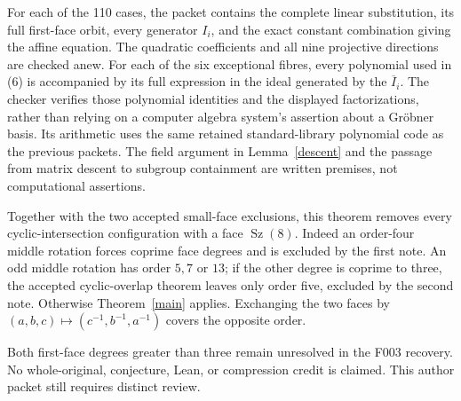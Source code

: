 \documentclass[11pt,a4paper]{article}
\newcommand{\Sz}{\operatorname{Sz}}
\begin{document}
For each of the 110 cases, the packet contains the complete linear
substitution, its full first-face orbit, every generator $I_i$, and
the exact constant combination giving the affine equation. The
quadratic coefficients and all nine projective directions are checked
anew. For each of the six exceptional fibres, every polynomial used
in (6) is accompanied by its full expression in the ideal generated
by the $\overline I_i$. The checker verifies those polynomial
identities and the displayed factorizations, rather than relying on
a computer algebra system's assertion about a Gr\"obner basis.
Its arithmetic uses the same retained standard-library polynomial
code as the previous packets. The field argument in
Lemma~\ref{descent} and the passage from matrix descent to subgroup
containment are written premises, not computational assertions.

Together with the two accepted small-face exclusions, this theorem
removes every cyclic-intersection configuration with a face $\Sz(8)$.
Indeed an order-four middle rotation forces coprime face degrees and
is excluded by the first note. An odd middle rotation has order
$5,7$ or $13$; if the other degree is coprime to three, the accepted
cyclic-overlap theorem leaves only order five, excluded by the second
note. Otherwise Theorem~\ref{main} applies. Exchanging the two faces
by $(a,b,c)\mapsto(c^{-1},b^{-1},a^{-1})$ covers the opposite order.

Both first-face degrees greater than three remain unresolved in the
F003 recovery. No whole-original, conjecture, Lean, or compression
credit is claimed. This author packet still requires distinct review.
\end{document}
